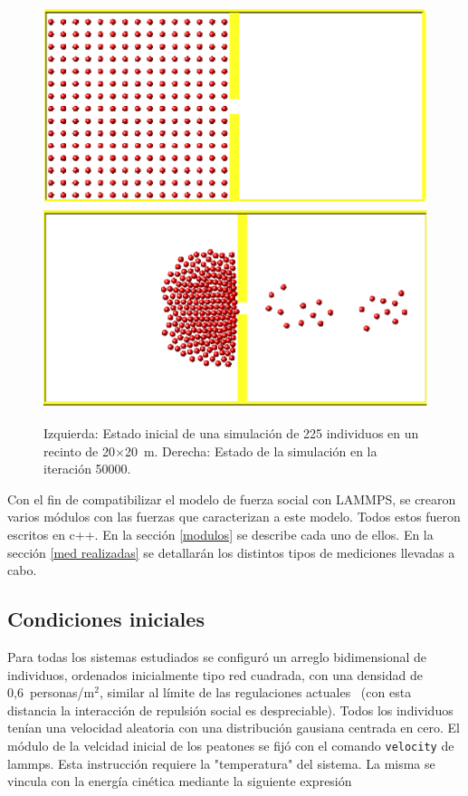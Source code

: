 \begin{figure}[H]
    \centering
    \includegraphics[scale=0.45]{figuras/0.eps}
    \hfill   
    \includegraphics[scale=0.45]{figuras/500.eps}
     \caption[width=5cm]{Izquierda: Estado inicial de una simulación de 225 individuos en un recinto de 20$\times$20~m. Derecha: Estado de la simulación en la iteración 50000. }
    \label{sim}
\end{figure}

Con el fin de compatibilizar el modelo de fuerza social con LAMMPS, se crearon varios módulos con las fuerzas que caracterizan a este modelo. Todos estos fueron escritos en c++. En la  sección \ref{modulos} se describe cada uno de ellos. 
En la sección \ref{med realizadas} se detallarán los distintos tipos de mediciones llevadas a cabo.

\subsection{\label{ci}Condiciones iniciales}

Para todas los sistemas estudiados se configuró un arreglo bidimensional de individuos, ordenados inicialmente tipo red cuadrada, con una densidad de 0,6~personas/m$^2$, similar al límite de las regulaciones actuales~\cite{mysen} (con esta distancia la interacción de repulsión social es despreciable). Todos los individuos tenían una velocidad aleatoria con una distribución gausiana centrada en cero. El módulo de la velcidad inicial de los peatones se fijó con el comando {\tt velocity} de lammps. Esta instrucción requiere la "temperatura" del sistema. La misma se vincula con la energía cinética mediante la siguiente expresión

